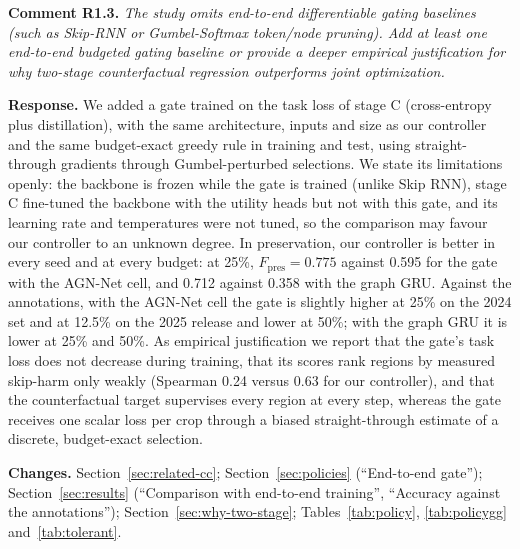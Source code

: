 \documentclass[11pt]{article}
\newcommand{\rc}[2]{\par\medskip\noindent\colorbox{black!6}{\parbox{\dimexpr\linewidth-2\fboxsep}{\textbf{Comment #1.} \itshape #2}}\par}
\newcommand{\resp}{\par\noindent\textbf{Response.} }
\newcommand{\chg}{\par\noindent\textbf{Changes.} }
\begin{document}
\rc{R1.3}{The study omits end-to-end differentiable gating baselines (such as Skip-RNN or Gumbel-Softmax token/node pruning). Add at least one end-to-end budgeted gating baseline or provide a deeper empirical justification for why two-stage counterfactual regression outperforms joint optimization.}
\resp We added a gate trained on the task loss of stage C (cross-entropy plus distillation), with the same architecture, inputs and size as our controller and the same budget-exact greedy rule in training and test, using straight-through gradients through Gumbel-perturbed selections. We state its limitations openly: the backbone is frozen while the gate is trained (unlike Skip RNN), stage C fine-tuned the backbone with the utility heads but not with this gate, and its learning rate and temperatures were not tuned, so the comparison may favour our controller to an unknown degree. In preservation, our controller is better in every seed and at every budget: at 25\%, $F_{\mathrm{pres}}=0.775$ against 0.595 for the gate with the AGN-Net cell, and 0.712 against 0.358 with the graph GRU. Against the annotations, with the AGN-Net cell the gate is slightly higher at 25\% on the 2024 set and at 12.5\% on the 2025 release and lower at 50\%; with the graph GRU it is lower at 25\% and 50\%. As empirical justification we report that the gate's task loss does not decrease during training, that its scores rank regions by measured skip-harm only weakly (Spearman 0.24 versus 0.63 for our controller), and that the counterfactual target supervises every region at every step, whereas the gate receives one scalar loss per crop through a biased straight-through estimate of a discrete, budget-exact selection.
\chg Section~\ref{sec:related-cc}; Section~\ref{sec:policies} (``End-to-end gate''); Section~\ref{sec:results} (``Comparison with end-to-end training'', ``Accuracy against the annotations''); Section~\ref{sec:why-two-stage}; Tables~\ref{tab:policy}, \ref{tab:policygg} and~\ref{tab:tolerant}.
\end{document}
